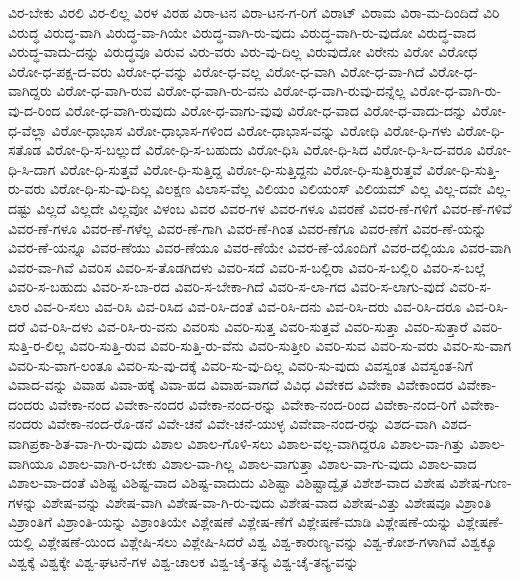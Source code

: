 {ವಿರ-ಬೇಕು
ವಿರಲಿ
ವಿರ-ಲಿಲ್ಲ
ವಿರಳ
ವಿರಹ
ವಿರಾ-ಟನ
ವಿರಾ-ಟನ-ಗ-ರಿಗೆ
ವಿರಾಟ್
ವಿರಾಮ
ವಿರಾ-ಮ-ದಿಂದಿದೆ
ವಿರಿ
ವಿರುದ್ಧ
ವಿರುದ್ಧ-ವಾಗಿ
ವಿರುದ್ಧ-ವಾ-ಗಿಯೇ
ವಿರುದ್ಧ-ವಾಗಿ-ರು-ವುದು
ವಿರುದ್ಧ-ವಾಗಿ-ರು-ವುದೋ
ವಿರುದ್ಧ-ವಾದ
ವಿರುದ್ಧ-ವಾದು-ದನ್ನು
ವಿರುದ್ಧವೂ
ವಿರುವ
ವಿರು-ವರು
ವಿರು-ವು-ದಿಲ್ಲ
ವಿರುವುದೋ
ವಿರೇನು
ವಿರೋ
ವಿರೋಧ
ವಿರೋ-ಧ-ಪಕ್ಷ-ದ-ವರು
ವಿರೋ-ಧ-ವನ್ನು
ವಿರೋ-ಧ-ವಲ್ಲ
ವಿರೋ-ಧ-ವಾಗಿ
ವಿರೋ-ಧ-ವಾ-ಗಿದೆ
ವಿರೋ-ಧ-ವಾಗಿದ್ದರು
ವಿರೋ-ಧ-ವಾಗಿ-ರುವ
ವಿರೋ-ಧ-ವಾಗಿ-ರು-ವನು
ವಿರೋ-ಧ-ವಾಗಿ-ರುವು-ದನ್ನೆಲ್ಲ
ವಿರೋ-ಧ-ವಾಗಿ-ರು-ವು-ದ-ರಿಂದ
ವಿರೋ-ಧ-ವಾಗಿ-ರುವುದು
ವಿರೋ-ಧ-ವಾಗು-ವುವು
ವಿರೋ-ಧ-ವಾದ
ವಿರೋ-ಧ-ವಾದು-ದನ್ನು
ವಿರೋ-ಧ-ವೆಲ್ಲಾ
ವಿರೋ-ಧಾಭಾಸ
ವಿರೋ-ಧಾಭಾಸ-ಗಳಿಂದ
ವಿರೋ-ಧಾಭಾಸ-ವನ್ನು
ವಿರೋಧಿ
ವಿರೋ-ಧಿ-ಗಳು
ವಿರೋ-ಧಿ-ಸತೊಡ
ವಿರೋ-ಧಿ-ಸ-ಬಲ್ಲುದೆ
ವಿರೋ-ಧಿ-ಸ-ಬಹುದು
ವಿರೋ-ಧಿಸಿ
ವಿರೋ-ಧಿ-ಸಿದ
ವಿರೋ-ಧಿ-ಸಿ-ದ-ವರೂ
ವಿರೋ-ಧಿ-ಸಿ-ದಾಗ
ವಿರೋ-ಧಿ-ಸುತ್ತವೆ
ವಿರೋ-ಧಿ-ಸುತ್ತಿದ್ದ
ವಿರೋ-ಧಿ-ಸುತ್ತಿದ್ದನು
ವಿರೋ-ಧಿ-ಸುತ್ತಿರುತ್ತವೆ
ವಿರೋ-ಧಿ-ಸುತ್ತಿ-ರು-ವರು
ವಿರೋ-ಧಿ-ಸು-ವು-ದಿಲ್ಲ
ವಿಲಕ್ಷಣ
ವಿಲಾಸ-ವೆಲ್ಲ
ವಿಲಿಯಂ
ವಿಲಿಯಂಸ್
ವಿಲಿಯಮ್
ವಿಲ್ಲ
ವಿಲ್ಲ-ದವೇ
ವಿಲ್ಲ-ದಷ್ಟು
ವಿಲ್ಲದೆ
ವಿಲ್ಲದೇ
ವಿಲ್ಲವೋ
ವಿಳಂಬ
ವಿವರ
ವಿವರ-ಗಳ
ವಿವರ-ಗಳೂ
ವಿವರಣೆ
ವಿವರ-ಣೆ-ಗಳಿಗೆ
ವಿವರ-ಣೆ-ಗಳಿವೆ
ವಿವರ-ಣೆ-ಗಳೂ
ವಿವರ-ಣೆ-ಗಳೆಲ್ಲ
ವಿವರ-ಣೆ-ಗಾಗಿ
ವಿವರ-ಣೆ-ಗಿಂತ
ವಿವರ-ಣೆಗೂ
ವಿವರ-ಣೆಗೆ
ವಿವರ-ಣೆ-ಯನ್ನು
ವಿವರ-ಣೆ-ಯನ್ನೂ
ವಿವರ-ಣೆಯು
ವಿವರ-ಣೆಯೂ
ವಿವರ-ಣೆಯೇ
ವಿವರ-ಣೆ-ಯೊಂದಿಗೆ
ವಿವರ-ದಲ್ಲಿಯೂ
ವಿವರ-ವಾಗಿ
ವಿವರ-ವಾ-ಗಿವೆ
ವಿವರಿಸ
ವಿವರಿ-ಸ-ತೊಡಗಿದಳು
ವಿವರಿ-ಸದೆ
ವಿವರಿ-ಸ-ಬಲ್ಲಿರಾ
ವಿವರಿ-ಸ-ಬಲ್ಲಿರಿ
ವಿವರಿ-ಸ-ಬಲ್ಲೆ
ವಿವರಿ-ಸ-ಬಹುದು
ವಿವರಿ-ಸ-ಬಾ-ರದ
ವಿವರಿ-ಸ-ಬೇಕಾ-ಗಿದೆ
ವಿವರಿ-ಸ-ಲಾ-ಗದ
ವಿವರಿ-ಸ-ಲಾಗು-ವುದೆ
ವಿವರಿ-ಸ-ಲಾರ
ವಿವ-ರಿ-ಸಲು
ವಿವ-ರಿಸಿ
ವಿವ-ರಿಸಿದ
ವಿವ-ರಿಸಿ-ದಂತೆ
ವಿವ-ರಿಸಿ-ದನು
ವಿವ-ರಿಸಿ-ದರು
ವಿವ-ರಿಸಿ-ದರೂ
ವಿವ-ರಿಸಿ-ದರೆ
ವಿವ-ರಿಸಿ-ದಳು
ವಿವ-ರಿಸಿ-ರು-ವನು
ವಿವರಿಸು
ವಿವರಿ-ಸುತ್ತ
ವಿವರಿ-ಸುತ್ತವೆ
ವಿವರಿ-ಸುತ್ತಾ
ವಿವರಿ-ಸುತ್ತಾರೆ
ವಿವರಿ-ಸುತ್ತಿ-ರ-ಲಿಲ್ಲ
ವಿವರಿ-ಸುತ್ತಿ-ರುವ
ವಿವರಿ-ಸುತ್ತಿ-ರು-ವೆನು
ವಿವರಿ-ಸುತ್ತೀರಿ
ವಿವರಿ-ಸುವ
ವಿವರಿ-ಸು-ವರು
ವಿವರಿ-ಸು-ವಾಗ
ವಿವರಿ-ಸು-ವಾಗ-ಲಂತೂ
ವಿವರಿ-ಸು-ವು-ದಕ್ಕೆ
ವಿವರಿ-ಸು-ವು-ದಿಲ್ಲ
ವಿವರಿ-ಸು-ವುದು
ವಿವಸ್ವಂತ
ವಿವಸ್ವಂತ-ನಿಗೆ
ವಿವಾದ-ವನ್ನು
ವಿವಾಹ
ವಿವಾ-ಹಕ್ಕೆ
ವಿವಾ-ಹದ
ವಿವಾಹ-ವಾಗದೆ
ವಿವಿಧ
ವಿವೇಕದ
ವಿವೇಕಾ
ವಿವೇಕಾಂದರ
ವಿವೇಕಾ-ದಂದರು
ವಿವೇಕಾ-ನಂದ
ವಿವೇಕಾ-ನಂದರ
ವಿವೇಕಾ-ನಂದ-ರನ್ನು
ವಿವೇಕಾ-ನಂದ-ರಿಂದ
ವಿವೇಕಾ-ನಂದ-ರಿಗೆ
ವಿವೇಕಾ-ನಂದರು
ವಿವೇಕಾ-ನಂದ-ರೊ-ಡನೆ
ವಿವೇ-ಚನೆ
ವಿವೇ-ಚನೆ-ಯುಳ್ಳ
ವಿವೇವಾ-ನಂದ-ರನ್ನು
ವಿಶದ-ವಾಗಿ
ವಿಶದ-ವಾಗಿಪ್ರಕಾ-ಶಿತ-ವಾ-ಗಿ-ರು-ವುದು
ವಿಶಾಲ
ವಿಶಾಲ-ಗೊಳಿ-ಸಲು
ವಿಶಾಲ-ವಲ್ಲ-ವಾಗಿದ್ದರೂ
ವಿಶಾಲ-ವಾ-ಗಿತ್ತು
ವಿಶಾಲ-ವಾಗಿಯೂ
ವಿಶಾಲ-ವಾಗಿ-ರ-ಬೇಕು
ವಿಶಾಲ-ವಾ-ಗಿಲ್ಲ
ವಿಶಾಲ-ವಾಗುತ್ತಾ
ವಿಶಾಲ-ವಾ-ಗು-ವುದು
ವಿಶಾಲ-ವಾದ
ವಿಶಾಲ-ವಾ-ದಂತೆ
ವಿಶಿಷ್ಟ
ವಿಶಿಷ್ಟ-ವಾದ
ವಿಶಿಷ್ಟ-ವಾದುದು
ವಿಶಿಷ್ಟಾ
ವಿಶಿಷ್ಟಾದ್ವೈತ
ವಿಶೇಶ-ವಾದ
ವಿಶೇಷ
ವಿಶೇಷ-ಗುಣ-ಗಳನ್ನು
ವಿಶೇಷ-ವನ್ನು
ವಿಶೇಷ-ವಾಗಿ
ವಿಶೇಷ-ವಾ-ಗಿ-ರು-ವುದು
ವಿಶೇಷ-ವಾದ
ವಿಶೇಷ-ವಿತ್ತು
ವಿಶೇಷವೂ
ವಿಶ್ರಾಂತಿ
ವಿಶ್ರಾಂತಿಗೆ
ವಿಶ್ರಾಂತಿ-ಯನ್ನು
ವಿಶ್ರಾಂತಿಯೇ
ವಿಶ್ಲೇಷಣೆ
ವಿಶ್ಲೇಷ-ಣೆಗೆ
ವಿಶ್ಲೇಷಣೆ-ಮಾಡಿ
ವಿಶ್ಲೇಷಣೆ-ಯನ್ನು
ವಿಶ್ಲೇಷಣೆ-ಯಲ್ಲಿ
ವಿಶ್ಲೇಷಣೆ-ಯಿಂದ
ವಿಶ್ಲೇಷಿ-ಸಲು
ವಿಶ್ಲೇಷಿ-ಸಿದರೆ
ವಿಶ್ವ
ವಿಶ್ವ-ಕಾರುಣ್ಯ-ವನ್ನು
ವಿಶ್ವ-ಕೋಶ-ಗಳಾಗಿವೆ
ವಿಶ್ವಕ್ಕೂ
ವಿಶ್ವಕ್ಕೆ
ವಿಶ್ವಕ್ಕೇ
ವಿಶ್ವ-ಘಟನೆ-ಗಳ
ವಿಶ್ವ-ಚಾಲಕ
ವಿಶ್ವ-ಚೈ-ತನ್ಯ
ವಿಶ್ವ-ಚೈ-ತನ್ಯ-ವನ್ನು
}
